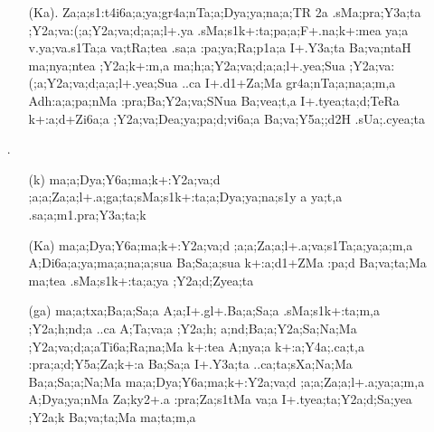 \begin{spacing}{1.15}
\begin{itemize}
\begin{itemize}
      \item[({\sktf Ka}).] {\sktf Za;a;s1:t4i6a;a;ya;gr4a;nTa;a;Dya;ya;na;a;TR%
2a .sMa;pra;Y3a;ta ;Y2a;va:(;a;Y2a;va;d;a;a;l+.ya%
\ZF{-}.sMa;s1k+:ta;pa;a;F+.na;k+:mea ya;a v.ya{;va}.s1Ta;a va;tRa;tea\ZF{,} .sa;a :pa;ya;Ra;p1a;a I+.Y3a;ta Ba;va;ntaH
ma;nya;ntea ;Y2a;k+:m,a ma;h;a;Y2a;va;d;a;a;l+.yea;Sua
;Y2a;va:(;a;Y2a;va;d;a;a;l+.yea;Sua ..ca
I+.d1+Za;Ma gr4a;nTa;a;na;a;m,a {A}{dh:a;a};pa;nMa {:pra};Ba;Y2a;va;SNua Ba;vea;t,a\ZF{,}
I+.tyea;ta;d;TeRa k+:a;d+Zi6a;a
;Y2a;va;Dea;ya;pa;d;vi6a;a Ba;va;Y5a;;d2H
.sUa;.cyea;ta}
               \end{itemize}

\item[{\sktf 13}.] \begin{itemize}
    \item[({\sktf k})] {\sktf ma;a;Dya;Y6a;ma;k+:Y2a;va;d%
;a;a;Za;a;l+.a;ga;ta;sMa;s1k+:ta;a;Dya;ya;na;s1y%
a ya;t,a .sa;a;m1.pra;Y3a;ta;k}

     \item[({\sktf Ka})] {\sktf ma;a;Dya;Y6a;ma;k+:Y2a;va;d%
;a;a;Za;a;l+.a;va;s1Ta;a;ya;a;m,a A;Di6a;a;ya;ma;a;na;a;sua
Ba;Sa;a;sua k+:a;d1+ZMa :pa;d Ba;va;ta;Ma ma{;tea} {.sMa};s1k+:ta;a;ya ;Y2a;d;Zyea;ta }
            
            \item[({\sktf ga})] {\sktf ma;a;txa;Ba;a;Sa;a\ZF{,}
A;a;I+.gl+.Ba;a;Sa;a\ZF{,} .sMa;s1k+:ta;m,a\ZF{,}
;Y2a;h;nd;a ..ca \ZF{(}A;Ta;va;a\ZF{,} ;Y2a;h;%
a;nd;Ba;a;Y2a;Sa;Na;Ma ;Y2a;va{;d;a;a}{Ti6a;Ra};na;Ma {k+:tea} A;nya;a k+:a;Y4a;.ca;t,a
:pra;a;d;Y5a;Za;k+:a Ba;Sa;a\ZF{),} I+.Y3a;ta
..ca;ta;sXa;Na;Ma Ba;a;Sa;a;Na;Ma ma;a;Dya;Y6a;ma;k+:Y2a;va;d%
;a;a;Za;a;l+.a;ya;a;m,a A;Dya;ya;nMa Za;ky2+.a :pra;Za;s1tMa va;a\ZF{,} I+.tyea;ta;Y2a;d;Sa;yea
;Y2a;k Ba;va;ta;Ma ma;ta;m,a}
            

\end{itemize}
\end{itemize}
\end{spacing}
